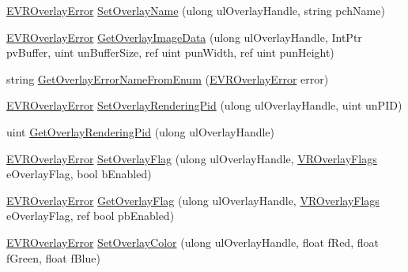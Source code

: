 \begin{DoxyCompactItemize}
\item 
\mbox{\hyperlink{namespace_valve_1_1_v_r_aaee5c5144f42b7969d45b854f51b0c18}{E\+V\+R\+Overlay\+Error}} \mbox{\hyperlink{class_valve_1_1_v_r_1_1_c_v_r_overlay_ae759f9f42507c41ad025441db77102b0}{Set\+Overlay\+Name}} (ulong ul\+Overlay\+Handle, string pch\+Name)
\item 
\mbox{\hyperlink{namespace_valve_1_1_v_r_aaee5c5144f42b7969d45b854f51b0c18}{E\+V\+R\+Overlay\+Error}} \mbox{\hyperlink{class_valve_1_1_v_r_1_1_c_v_r_overlay_a7c2e857b9f28444253c53ed0d59d52b9}{Get\+Overlay\+Image\+Data}} (ulong ul\+Overlay\+Handle, Int\+Ptr pv\+Buffer, uint un\+Buffer\+Size, ref uint pun\+Width, ref uint pun\+Height)
\item 
string \mbox{\hyperlink{class_valve_1_1_v_r_1_1_c_v_r_overlay_aa229e018f282d14374250dd370bcc93e}{Get\+Overlay\+Error\+Name\+From\+Enum}} (\mbox{\hyperlink{namespace_valve_1_1_v_r_aaee5c5144f42b7969d45b854f51b0c18}{E\+V\+R\+Overlay\+Error}} error)
\item 
\mbox{\hyperlink{namespace_valve_1_1_v_r_aaee5c5144f42b7969d45b854f51b0c18}{E\+V\+R\+Overlay\+Error}} \mbox{\hyperlink{class_valve_1_1_v_r_1_1_c_v_r_overlay_a7f2d7727b2865cec887468397e65c07b}{Set\+Overlay\+Rendering\+Pid}} (ulong ul\+Overlay\+Handle, uint un\+P\+ID)
\item 
uint \mbox{\hyperlink{class_valve_1_1_v_r_1_1_c_v_r_overlay_aba8e674f3848298ac879e4e1e1f4161e}{Get\+Overlay\+Rendering\+Pid}} (ulong ul\+Overlay\+Handle)
\item 
\mbox{\hyperlink{namespace_valve_1_1_v_r_aaee5c5144f42b7969d45b854f51b0c18}{E\+V\+R\+Overlay\+Error}} \mbox{\hyperlink{class_valve_1_1_v_r_1_1_c_v_r_overlay_a5e79960d92824eb6bf45bc0ca27c00b4}{Set\+Overlay\+Flag}} (ulong ul\+Overlay\+Handle, \mbox{\hyperlink{namespace_valve_1_1_v_r_a34c8e00ad63b95c5f533b1387bcab6ff}{V\+R\+Overlay\+Flags}} e\+Overlay\+Flag, bool b\+Enabled)
\item 
\mbox{\hyperlink{namespace_valve_1_1_v_r_aaee5c5144f42b7969d45b854f51b0c18}{E\+V\+R\+Overlay\+Error}} \mbox{\hyperlink{class_valve_1_1_v_r_1_1_c_v_r_overlay_a12cddf2fd4ccd4456585f0826d3b531e}{Get\+Overlay\+Flag}} (ulong ul\+Overlay\+Handle, \mbox{\hyperlink{namespace_valve_1_1_v_r_a34c8e00ad63b95c5f533b1387bcab6ff}{V\+R\+Overlay\+Flags}} e\+Overlay\+Flag, ref bool pb\+Enabled)
\item 
\mbox{\hyperlink{namespace_valve_1_1_v_r_aaee5c5144f42b7969d45b854f51b0c18}{E\+V\+R\+Overlay\+Error}} \mbox{\hyperlink{class_valve_1_1_v_r_1_1_c_v_r_overlay_ad2423261de779a1da057aedd586e4ce1}{Set\+Overlay\+Color}} (ulong ul\+Overlay\+Handle, float f\+Red, float f\+Green, float f\+Blue)

\end{DoxyCompactItemize}
